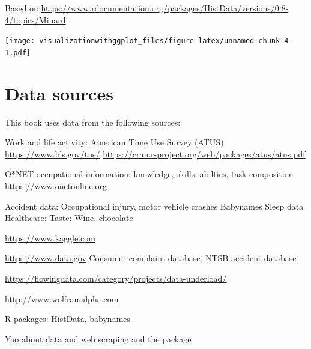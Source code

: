 \documentclass[]{krantz}
\begin{document}
Based on \url{https://www.rdocumentation.org/packages/HistData/versions/0.8-4/topics/Minard}

\texttt{[image: visualizationwithggplot\_files/figure-latex/unnamed-chunk-4-1.pdf]}

\hypertarget{data-sources}{%
\section{Data sources}\label{data-sources}}

This book uses data from the following sources:

Work and life activity:
American Time Use Survey (ATUS)
\url{https://www.bls.gov/tus/}
\url{https://cran.r-project.org/web/packages/atus/atus.pdf}

O*NET occupational information: knowledge, skills, abilties, task composition
\url{https://www.onetonline.org}

Accident data: Occupational injury, motor vehicle crashes
Babynames
Sleep data
Healthcare:
Taste: Wine, chocolate

\url{https://www.kaggle.com}

\url{https://www.data.gov} Consumer complaint database, NTSB accident database

\url{https://flowingdata.com/category/projects/data-underload/}

\url{http://www.wolframalpha.com}

R packages: HistData, babynames

Yao about data and web scraping and the package
\end{document}
